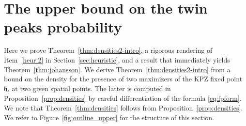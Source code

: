 \documentclass[oneside,final,11pt]{amsart}
\theoremstyle{definition}
\newcommand{\fh}{\mathfrak{h}}
\newcommand{\R}{\mathbb{R}}
\newcommand{\CL}{\mathcal{L}}
\newcommand{\1}[1]{\mathbf{1}_{#1}}
\newcommand{\Max}{\mathrm{Max}}
\numberwithin{equation}{section}
\begin{document}

 \section{The upper bound on the twin peaks probability}
 \label{sec:TwinPeaks}

Here we prove Theorem~\ref{thm:densities2-intro}, a rigorous rendering of Item~\ref{heur:2} in Section~\ref{sec:heuristic}, and a result that immediately yields Theorem~\ref{thm:johansson}. We derive Theorem~\ref{thm:densities2-intro} from a bound on the density for the presence of two maximizers of the KPZ fixed point $\fh_t$ at two given spatial points. The latter is computed in Proposition~\ref{prop:densities} by careful differentiation of the formula \eqref{eq:fpform}. We note that Theorem~\ref{thm:densities} follows from Proposition~\ref{prop:densities}. We refer to Figure~\ref{fig:outline_upper} for the structure of this section.
\end{document}
